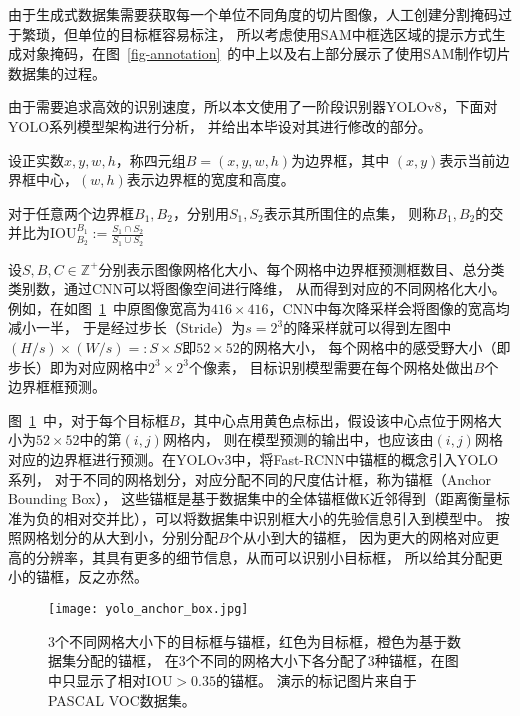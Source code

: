 由于生成式数据集需要获取每一个单位不同角度的切片图像，人工创建分割掩码过于繁琐，但单位的目标框容易标注，
所以考虑使用SAM中框选区域的提示方式生成对象掩码，在图~\ref{fig-annotation}~的中上以及右上部分展示了使用SAM制作切片数据集的过程。

由于需要追求高效的识别速度，所以本文使用了一阶段识别器YOLOv8，下面对YOLO系列模型架构进行分析，
并给出本毕设对其进行修改的部分。

\begin{definition}\label{def-iou}
  设正实数$x,y,w,h$，称四元组$B=(x,y,w,h)$为边界框，其中
  $(x,y)$表示当前边界框中心，$(w,h)$表示边界框的宽度和高度。
\end{definition}
\begin{definition}
  对于任意两个边界框$B_1,B_2$，分别用$S_1,S_2$表示其所围住的点集，
  则称$B_1,B_2$的交并比为$\text{IOU}_{B_2}^{B_1}:=\frac{S_1\cap S_2}{S_1\cup S_2}$
\end{definition}

设$S,B,C\in\mathbb{Z}^+$分别表示图像网格化大小、每个网格中边界框预测框数目、总分类类别数，通过CNN可以将图像空间进行降维，
从而得到对应的不同网格化大小。例如，在如图~\ref{fig-anchor}~中原图像宽高为$416\times 416$，CNN中每次降采样会将图像的宽高均减小一半，
于是经过步长（Stride）为$s=2^3$的降采样就可以得到左图中$(H/s)\times (W/s) =: S\times S$即$52\times 52$的网格大小，
每个网格中的感受野大小（即步长）即为对应网格中$2^3\times 2^3$个像素，
目标识别模型需要在每个网格处做出$B$个边界框框预测。

图~\ref{fig-anchor}~中，对于每个目标框$B$，其中心点用黄色点标出，假设该中心点位于网格大小为$52\times 52$中的第$(i,j)$网格内，
则在模型预测的输出中，也应该由$(i,j)$网格对应的边界框进行预测。在YOLOv3中，将Fast-RCNN中锚框的概念引入YOLO系列，
对于不同的网格划分，对应分配不同的尺度估计框，称为锚框（Anchor Bounding Box），
这些锚框是基于数据集中的全体锚框做K近邻得到（距离衡量标准为负的相对交并比），可以将数据集中识别框大小的先验信息引入到模型中。
按照网格划分的从大到小，分别分配$B$个从小到大的锚框，
因为更大的网格对应更高的分辨率，其具有更多的细节信息，从而可以识别小目标框，
所以给其分配更小的锚框，反之亦然。

\begin{figure}[htbp]
  \centering
  \texttt{[image: yolo\_anchor\_box.jpg]}
  \caption{3个不同网格大小下的目标框与锚框，红色为目标框，橙色为基于数据集分配的锚框，
  在3个不同的网格大小下各分配了3种锚框，在图中只显示了相对$\text{IOU}>0.35$的锚框。
  演示的标记图片来自于PASCAL VOC数据集。}
  \label{fig-anchor}
\end{figure}

